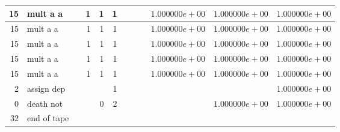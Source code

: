 \documentclass{article}
\begin{document}
\begin{tabular}{|r|l|r|r|r|r||r|r||r|r|r|r|}
15 & mult a a & & 1 & 1 & 1 & & & &$ 1.000000e+00 $&$ 1.000000e+00 $&$ 1.000000e+00 $\\ \hline 
15 & mult a a & & 1 & 1 & 1 & & & &$ 1.000000e+00 $&$ 1.000000e+00 $&$ 1.000000e+00 $\\ \hline 
15 & mult a a & & 1 & 1 & 1 & & & &$ 1.000000e+00 $&$ 1.000000e+00 $&$ 1.000000e+00 $\\ \hline 
15 & mult a a & & 1 & 1 & 1 & & & &$ 1.000000e+00 $&$ 1.000000e+00 $&$ 1.000000e+00 $\\ \hline 
15 & mult a a & & 1 & 1 & 1 & & & &$ 1.000000e+00 $&$ 1.000000e+00 $&$ 1.000000e+00 $\\ \hline 
2 & assign dep & & & & 1 & & & & & &$ 1.000000e+00 $\\ \hline 
0 & death not & & & 0 & 2 & & & & &$ 1.000000e+00 $&$ 1.000000e+00 $\\ \hline 
 32 & end of tape & & & & & & & & & &  \\ \hline 
\end{tabular}
\end{document}

